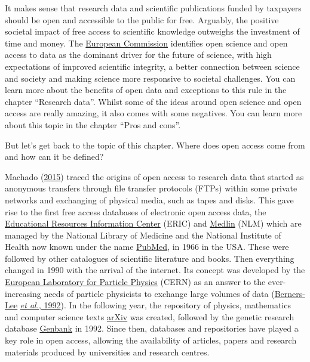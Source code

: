 \documentclass[
]{book}
\begin{document}
It makes sense that research data and scientific publications funded by taxpayers should be open and accessible to the public for free. Arguably, the positive societal impact of free access to scientific knowledge outweighs the investment of time and money. The \href{https://ec.europa.eu/info/research-and-innovation/strategy/strategy-2020-2024/our-digital-future/open-science_en}{European Commission} identifies open science and open access to data as the dominant driver for the future of science, with high expectations of improved scientific integrity, a better connection between science and society and making science more responsive to societal challenges. You can learn more about the benefits of open data and exceptions to this rule in the chapter ``Research data''. Whilst some of the ideas around open science and open access are really amazing, it also comes with some negatives. You can learn more about this topic in the chapter ``Pros and cons''.

But let's get back to the topic of this chapter. Where does open access come from and how can it be defined?

Machado (\href{https://goingdigital.oecd.org/data/notes/No13_ToolkitNote_OpenScience.pdf}{2015}) traced the origins of open access to research data that started as anonymous transfers through file transfer protocols (FTPs) within some private networks and exchanging of physical media, such as tapes and disks. This gave rise to the first free access databases of electronic open access data, the \href{http://www.eric.ed.gov/}{Educational Resources Information Center} (ERIC) and \href{https://www.nlm.nih.gov/}{Medlin} (NLM) which are managed by the National Library of Medicine and the National Institute of Health now known under the name \href{http://www.pubmed.gov/}{PubMed}, in 1966 in the USA. These were followed by other catalogues of scientific literature and books. Then everything changed in 1990 with the arrival of the internet. Its concept was developed by the \href{https://home.web.cern.ch/}{European Laboratory for Particle Physics} (CERN) as an answer to the ever-increasing needs of particle physicists to exchange large volumes of data (\href{https://www.academia.edu/2148655/World_Wide_Web_The_Information_Universe}{Berners-Lee} \href{https://www.academia.edu/2148655/World_Wide_Web_The_Information_Universe}{\emph{et al.}, 1992}). In the following year, the repository of physics, mathematics and computer science texts \href{http://arxiv.org/}{arXiv} was created, followed by the genetic research database \href{http://www.ncbi.nlm.nih.gov/genbank}{Genbank} in 1992. Since then, databases and repositories have played a key role in open access, allowing the availability of articles, papers and research materials produced by universities and research centres.
\end{document}
